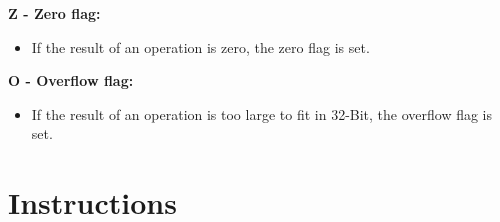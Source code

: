 \documentclass[titlepage]{scrartcl}
\begin{document}
\newcommand{\flagdesc}[3]{
	\hfill \break
	\textbf{#2 - #1 flag:}
	\begin{itemize}
		\item #3
	\end{itemize}
}

\flagdesc{Zero}{Z}{If the result of an operation is zero, the zero flag is set.}
\flagdesc{Overflow}{O}{If the result of an operation is too large to fit in 32-Bit, the overflow flag is set.}
\newpage

\section{Instructions}

\newcommand{\instruction}[9]{
	\subsection{#1 - #2}
	\begin{tabularx}{\textwidth}{XXX}
		\textbf{Description:}     &                   &                          \\
		\multicolumn{3}{>{\hsize=\dimexpr3\hsize+3\tabcolsep}X}{#3}              \\ [1ex]
		\textbf{Operation:}       &                   &                          \\
		\multicolumn{3}{>{\hsize=\dimexpr3\hsize+3\tabcolsep}X}{#4}              \\ [1ex]
		\textbf{Syntax}           & \textbf{Operands} & \textbf{Program counter} \\
		\texttt{#5}               & #6                & #7                       \\ [1ex]
		\textbf{Opcode:}          &                   &                          \\
		\multicolumn{3}{>{\hsize=\dimexpr3\hsize+3\tabcolsep}X}{#8}              \\ [1ex]
		\textbf{Status register:} &                   &                          \\
		\multicolumn{3}{>{\hsize=\dimexpr3\hsize+3\tabcolsep}X}{#9}              \\ [1ex]
	\end{tabularx}
	\newpage
}

\newcommand{\opcodegen}[4]{
	\begin{tabularx}{\textwidth}{|Y|Y|Y|Y|}
		\hline
		#1 & #2 & #3 & #4 \\
		\hline
	\end{tabularx}
}
\end{document}
